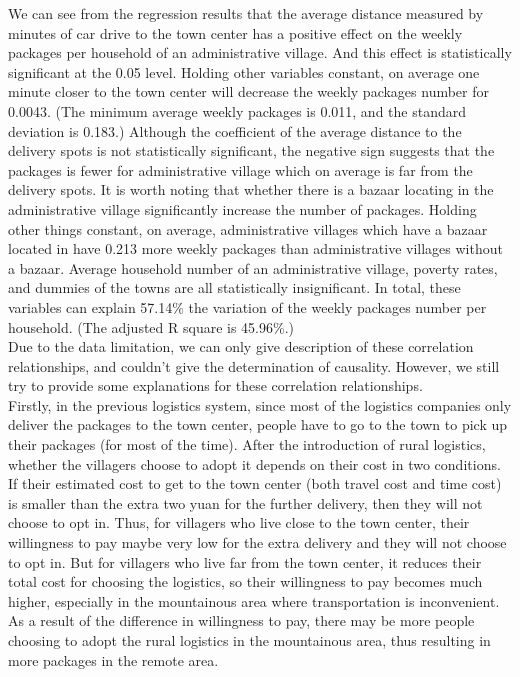 \documentclass{article}
\begin{document}
\mbox{\hspace{2em}}
We can see from the regression results that the average distance measured by minutes of car drive to the town center has a positive effect on the weekly packages per household of an administrative village. And this effect is statistically significant at the 0.05 level. Holding other variables constant, on average one minute closer to the town center will decrease the weekly packages number for 0.0043. (The minimum average weekly packages is 0.011, and the standard deviation is 0.183.) Although the coefficient of the average distance to the delivery spots is not statistically significant, the negative sign suggests that the packages is fewer for administrative village which on average is far from the delivery spots. It is worth noting that whether there is a bazaar locating in the administrative village significantly increase the number of packages. Holding other things constant, on average, administrative villages which have a bazaar located in have 0.213 more weekly packages than administrative villages without a bazaar. Average household number of an administrative village, poverty rates, and dummies of the towns are all statistically insignificant. In total, these variables can explain 57.14\% the variation of the weekly packages number per household. (The adjusted R square is 45.96\%.)\\
\mbox{\hspace{2em}}
Due to the data limitation, we can only give description of these correlation relationships, and couldn’t give the determination of causality. However, we still try to provide some explanations for these correlation relationships.\\
\mbox{\hspace{2em}}
Firstly, in the previous logistics system, since most of the logistics companies only deliver the packages to the town center, people have to go to the town to pick up their packages (for most of the time). After the introduction of rural logistics, whether the villagers choose to adopt it depends on their cost in two conditions. If their estimated cost to get to the town center (both travel cost and time cost) is smaller than the extra two yuan for the further delivery, then they will not choose to opt in. Thus, for villagers who live close to the town center, their willingness to pay maybe very low for the extra delivery and they will not choose to opt in. But for villagers who live far from the town center, it reduces their total cost for choosing the logistics, so their willingness to pay becomes much higher, especially in the mountainous area where transportation is inconvenient. As a result of the difference in willingness to pay, there may be more people choosing to adopt the rural logistics in the mountainous area, thus resulting in more packages in the remote area. \\
\end{document}
